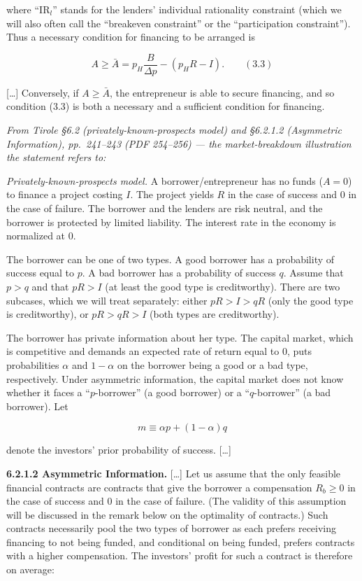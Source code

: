 \documentclass[11pt,a4paper]{article}
\begin{document}
where ``IR\(_l\)'' stands for the lenders' individual rationality constraint (which we will also
often call the ``breakeven constraint'' or the ``participation constraint''). Thus a necessary
condition for financing to be arranged is

\[A \geqslant \bar{A} = p_H \frac{B}{\Delta p} - (p_H R - I). \qquad (3.3)\]

{[}\ldots{]} Conversely, if \(A \geqslant \bar{A}\), the entrepreneur is able to secure financing,
and so condition (3.3) is both a necessary and a sufficient condition for financing.

\emph{From Tirole §6.2 (privately-known-prospects model) and §6.2.1.2 (Asymmetric Information),
pp.~241--243 (PDF 254--256) --- the market-breakdown illustration the statement refers to:}

\emph{Privately-known-prospects model.} A borrower/entrepreneur has no funds (\(A = 0\)) to finance
a project costing \(I\). The project yields \(R\) in the case of success and 0 in the case of
failure. The borrower and the lenders are risk neutral, and the borrower is protected by limited
liability. The interest rate in the economy is normalized at 0.

The borrower can be one of two types. A good borrower has a probability of success equal to \(p\). A
bad borrower has a probability of success \(q\). Assume that \(p > q\) and that \(pR > I\) (at least
the good type is creditworthy). There are two subcases, which we will treat separately: either
\(pR > I > qR\) (only the good type is creditworthy), or \(pR > qR > I\) (both types are
creditworthy).

The borrower has private information about her type. The capital market, which is competitive and
demands an expected rate of return equal to 0, puts probabilities \(\alpha\) and \(1 - \alpha\) on
the borrower being a good or a bad type, respectively. Under asymmetric information, the capital
market does not know whether it faces a ``\(p\)-borrower'' (a good borrower) or a ``\(q\)-borrower''
(a bad borrower). Let

\[m \equiv \alpha p + (1 - \alpha) q\]

denote the investors' prior probability of success. {[}\ldots{]}

\textbf{6.2.1.2 Asymmetric Information.} {[}\ldots{]} Let us assume that the only feasible financial
contracts are contracts that give the borrower a compensation \(R_b \geqslant 0\) in the case of
success and 0 in the case of failure. (The validity of this assumption will be discussed in the
remark below on the optimality of contracts.) Such contracts necessarily pool the two types of
borrower as each prefers receiving financing to not being funded, and conditional on being funded,
prefers contracts with a higher compensation. The investors' profit for such a contract is therefore
on average:
\end{document}
